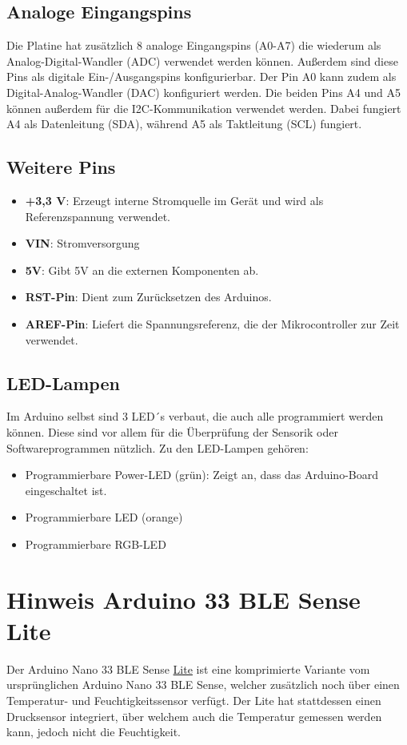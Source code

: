 \subsection{Analoge Eingangspins}
Die Platine hat zusätzlich 8 analoge Eingangspins (A0-A7) die wiederum als Analog-Digital-Wandler (ADC) verwendet werden können. Außerdem sind diese Pins als digitale Ein-/Ausgangspins konfigurierbar. Der Pin A0 kann zudem als Digital-Analog-Wandler (DAC) konfiguriert werden. Die beiden Pins A4 und A5 können außerdem für die I2C-Kommunikation verwendet werden. Dabei fungiert A4 als Datenleitung (SDA), während A5 als Taktleitung (SCL) fungiert.\cite{Ard.2024}

\subsection{Weitere Pins}
	\begin{itemize}
		\item \textbf{+3,3 V}: Erzeugt interne Stromquelle im Gerät und wird als Referenzspannung verwendet.
		\item \textbf{VIN}: Stromversorgung
		\item \textbf{5V}: Gibt 5V an die externen Komponenten ab. 
		\item \textbf{RST-Pin}: Dient zum Zurücksetzen des Arduinos.
		\item \textbf{AREF-Pin}: Liefert die Spannungsreferenz, die der Mikrocontroller zur Zeit verwendet.
		\\ \cite{Ard.2024}
	\end{itemize}

\subsection{LED-Lampen}
Im Arduino selbst sind 3 LED´s verbaut, die auch alle programmiert werden können. Diese sind vor allem für die Überprüfung der Sensorik oder Softwareprogrammen nützlich. Zu den LED-Lampen gehören: 
	\begin{itemize}
		\item Programmierbare Power-LED (grün): Zeigt an, dass das Arduino-Board eingeschaltet ist.
		\item Programmierbare LED (orange)
		\item Programmierbare RGB-LED
		\\ \cite{Ard.2024}
	\end{itemize}

\section{Hinweis Arduino 33 BLE Sense Lite \label{Hinweis Arduino 33 BLE Sense Lite}}
Der Arduino Nano 33 BLE Sense \underline{Lite} ist eine komprimierte Variante vom ursprünglichen Arduino Nano 33 BLE Sense, welcher zusätzlich noch über einen Temperatur- und Feuchtigkeitssensor verfügt. Der Lite hat stattdessen einen Drucksensor integriert, über welchem auch die Temperatur gemessen werden kann, jedoch nicht die Feuchtigkeit.\cite{PetrFilipi.2022}
